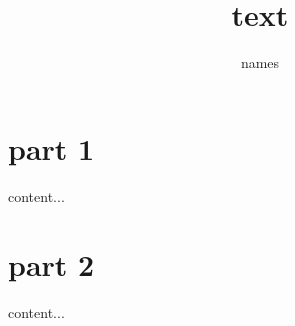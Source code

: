 \documentclass{beamer}
\author{names}
\title{text}
\institute{institute}
\begin{document}
\begin{frame}
\titlepage
\end{frame}

\part{part 1}
\begin{frame}
content...
\end{frame}

\part{part 2}
\begin{frame}
content...
\end{frame}
\end{document}
